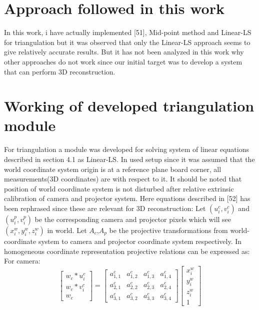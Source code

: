 \section{Approach followed in this work}
In this work, i have actually implemented [51], Mid-point method and Linear-LS  for triangulation but it was observed that only the Linear-LS approach seems to give relatively accurate results. But it has not been analyzed in this work why other approaches do not work since our initial target was to develop a system that can perform 3D reconstruction. 

\section{Working of developed triangulation module}
For triangulation a module was developed for solving system of linear equations described in section 4.1 as Linear-LS. In used setup since it was assumed that the world coordinate system origin is at a reference plane board corner, all measurements(3D coordinates) are with respect to it. It should be noted that position of world coordinate system is not disturbed after relative extrinsic calibration of camera and projector system. Here equations described in [52] has been rephrased since these are relevant for 3D reconstruction:
Let $(u_i^c,v_i^c)$ and $(u_i^p,v_i^p)$ be the corresponding camera and projector pixels which will see $(x_i^w,y_i^w,z_i^w)$ in world. Let $A_c$,$A_p$ be the projective transformations from world-coordinate system to camera and projector coordinate system respectively. In homogeneous coordinate representation projective relations can be expressed as:\newline
\noindent
For camera:
\begin{equation}
\begin{bmatrix}
w_c*u_i^c \\
w_c*v_i^c \\
w_c
\end{bmatrix}
=\begin{bmatrix}
a_{1,1}^c & a_{1,2}^c & a_{1,3}^c & a_{1,4}^c \\
a_{2,1}^c & a_{2,2}^c & a_{2,3}^c & a_{2,4}^c \\
a_{3,1}^c & a_{3,2}^c & a_{3,3}^c & a_{3,4}^c 
\end{bmatrix}
\begin{bmatrix}
x_i^w\\
y_i^w\\
z_i^w\\
1
\end{bmatrix}
\end{equation}
